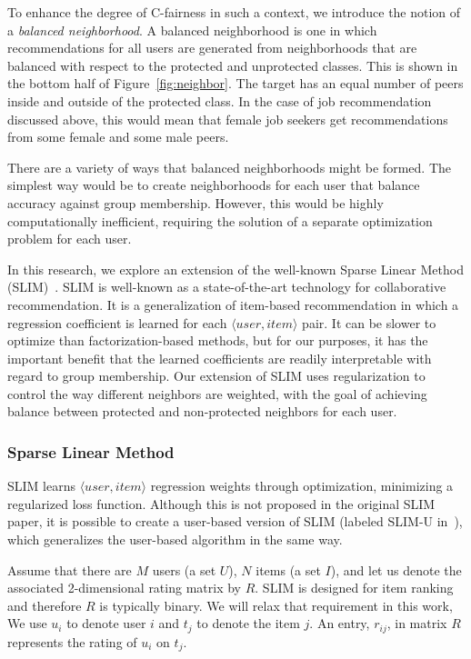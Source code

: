 To enhance the degree of C-fairness in such a context, we introduce the notion of a \textit{balanced neighborhood}. A balanced neighborhood is one in which recommendations for all users are generated from neighborhoods that are balanced with respect to the protected and unprotected classes. This is shown in the bottom half of Figure~\ref{fig:neighbor}. The target has an equal number of peers inside and outside of the protected class. In the case of job recommendation discussed above, this would mean that female job seekers get recommendations from some female and some male peers.

There are a variety of ways that balanced neighborhoods might be formed. The simplest way would be to create neighborhoods for each user that balance accuracy against group membership. However, this would be highly computationally inefficient, requiring the solution of a separate optimization problem for each user. 

In this research, we explore an extension of the well-known Sparse Linear Method (SLIM)~\cite{ning2011slim}. SLIM is well-known as a state-of-the-art technology for collaborative recommendation. It is a generalization of item-based recommendation in which a regression coefficient is learned for each $\langle user, item \rangle$ pair. It can be slower to optimize than factorization-based methods, but for our purposes, it has the important benefit that the learned coefficients are readily interpretable with regard to group membership. Our extension of SLIM uses regularization to control the way different neighbors are weighted, with the goal of achieving balance between protected and non-protected neighbors for each user.

\subsubsection{\textbf{Sparse Linear Method}}
\hfill

SLIM learns $\langle user, item \rangle$ regression weights through optimization, minimizing a regularized loss function. Although this is not proposed in the original SLIM paper, it is possible to create a user-based version of SLIM (labeled SLIM-U in~\cite{zheng2014cslim}), which generalizes the user-based algorithm in the same way. 

Assume that there are $M$ users (a set $U$), $N$ items (a set $I$), and let us denote the associated 2-dimensional rating matrix by $R$. SLIM is designed for item ranking and therefore $R$ is typically binary. We will relax that requirement in this work, We use $u_i$ to denote user $i$ and $t_j$ to denote the item $j$. An entry, $r_{ij}$, in matrix $R$ represents the rating of $u_i$ on $t_j$.

